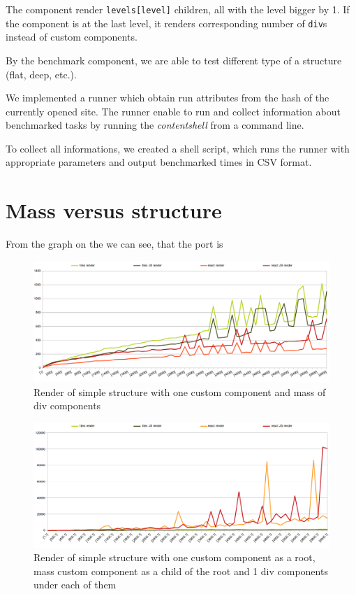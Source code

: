 The component render \texttt{levels[level]} children, all with the level bigger by 1.
If the component is at the last level, it renders corresponding number of \texttt{div}s instead of custom components.

By the benchmark component, we are able to test different type of a structure (flat, deep, etc.).

We implemented a runner which obtain run attributes from the hash of the currently opened site. 
The runner enable to run and collect information about benchmarked tasks by running the \textit{content\textunderscore shell} from a command line.

To collect all informations, we created a shell script, which runs the runner with appropriate parameters and output benchmarked times in CSV format.

\section{Mass versus structure}\label{sec:benchmarks-mass-vs-structure}

	From the graph on the  we can see, that the \react port is 
	\begin{figure}[h]
	\centering  
		\includegraphics[scale=0.5]{images/benchmarks/m_render.png}
		\caption{Render of simple structure with one custom component and mass of div components}
		\label{img:benchmarks-mass-render}
	\end{figure}

	\begin{figure}[h]
	\centering  
		\includegraphics[scale=0.5]{images/benchmarks/m1_render.png}
		\caption{Render of simple structure with one custom component as a root, mass custom component as a child of the root and 1 div components under each of them}
		\label{img:benchmarks-mass-1-render}
	\end{figure}

